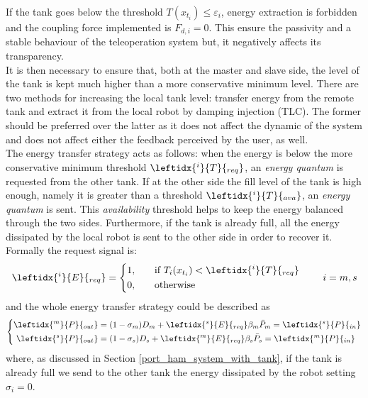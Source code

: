If the tank goes below the threshold $T({x_{t_{i}}}) \leq \varepsilon_{i}$, energy extraction is forbidden and the coupling force implemented is $F_{d,i} = 0$.
This ensure the passivity and a stable behaviour of the teleoperation system but, it negatively affects its transparency.\\
It is then necessary to ensure that, both at the master and slave side, the level of the tank is kept much higher than a more conservative minimum level.
There are two methods for increasing the local tank level: transfer energy from the remote tank and extract it from the local robot by damping injection (TLC). The former should be preferred over the latter as it does not affect the dynamic of the system and does not affect either the feedback perceived by the user, as well.\\
The energy transfer strategy acts as follows: when the energy is below the more conservative minimum threshold $\leftidx{^i}{T}{_{req}}$, an \textit{energy quantum} is requested from the other tank. If at the other side the fill level of the tank is high enough, namely it is greater than a threshold $\leftidx{^i}{T}{_{ava}}$, an \textit{energy quantum} is sent. This \textit{availability} threshold helps to keep the energy balanced through the two sides.
Furthermore, if the tank is already full, all the energy dissipated by the local robot is sent to the other side in order to recover it.
Formally the request signal is:
\begin{equation}
	\left. 
	\leftidx{^i}{E}{_{req}}=
	\begin{dcases}
		1, \quad & \mbox{if} \ T_{i}(x_{t_{i}}) < \leftidx{^i}{T}{_{req}}\\
		0, \quad & \mbox{otherwise} 
	\end{dcases}
	\right. \qquad i=m,s
\end{equation}
and the whole energy transfer strategy could be described as
\begin{equation}\label{Transmission_strategy}
	\left\lbrace 
	\begin{aligned}
		\leftidx{^m}{P}{_{out}} &=(1- \sigma_{m})D_{m} + 	\leftidx{^s}{E}{_{req}} \beta_{m}\bar{P}_{m} =  \leftidx{^s}{P}{_{in}} \\
		\leftidx{^s}{P}{_{out}} &= (1- \sigma_{s})D_{s} + 	\leftidx{^m}{E}{_{req}} \beta_{s}\bar{P}_{s} =  \leftidx{^m}{P}{_{in}}
	\end{aligned}
	\right.
\end{equation}
where, as discussed in Section \ref{port_ham_system_with_tank}, if the tank is already full we send to the other tank the energy dissipated by the robot setting $\sigma_{i} = 0$.\\
